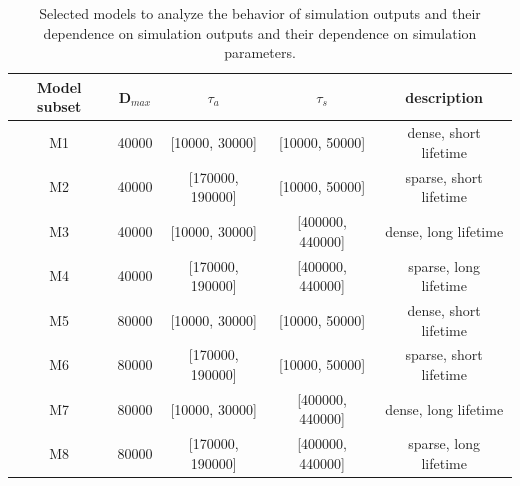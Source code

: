 


\setlength{\tabcolsep}{10pt}
\begin{table}
\centering
\begin{tabular}{ccccc}
\hline
Model subset & D$_{max}$ & $\tau_a$ & $\tau_s$ & description  \\
\hline
M1 & 40000 & [10000, 30000]   & [10000, 50000]   &dense, short lifetime\\
M2 & 40000 & [170000, 190000] & [10000, 50000]   &sparse, short lifetime\\
M3 & 40000 & [10000, 30000]   & [400000, 440000] &dense, long lifetime \\
M4 & 40000 & [170000, 190000] & [400000, 440000] &sparse, long lifetime\\
%
M5 & 80000 & [10000, 30000]   & [10000, 50000]   &dense, short lifetime\\
M6 & 80000 & [170000, 190000] & [10000, 50000]   &sparse, short lifetime\\
M7 & 80000 & [10000, 30000]   & [400000, 440000] &dense, long lifetime \\
M8 & 80000 & [170000, 190000] & [400000, 440000] &sparse, long lifetime\\
%
\hline
\end{tabular}
\caption{Selected models to analyze the behavior of simulation outputs
   and their dependence on simulation outputs and their dependence on
   simulation parameters.}
\label{T_selected_models}
\end{table}

 

